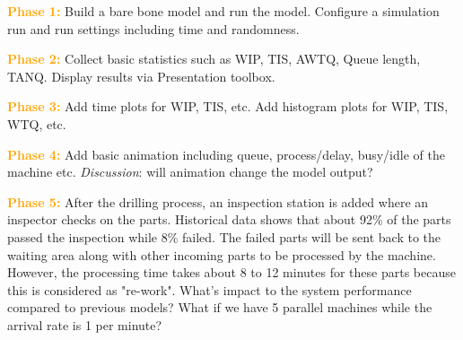 \documentclass{article}
\begin{document}
\vskip 0.3in

\textcolor{orange}{\bf Phase 1:} Build a bare bone model and run the model. Configure a simulation run and run settings including time and randomness. 

\vskip 0.3in

\textcolor{orange}{\bf Phase 2:} Collect basic statistics such as WIP, TIS, AWTQ, Queue length, TANQ. Display results via Presentation toolbox. 
  
\vskip 0.3in

\textcolor{orange}{\bf Phase 3:} Add time plots for WIP, TIS, etc. Add histogram plots for WIP, TIS, WTQ, etc. 

\vskip 0.3in

\textcolor{orange}{\bf Phase 4:} Add basic animation including queue, process/delay, busy/idle of the machine etc. \textit{Discussion}: will animation change the model output?

\vskip 0.3in

\textcolor{orange}{\bf Phase 5:} After the drilling process, an inspection station is added where an inspector checks on the parts. Historical data shows that about 92\% of the parts passed the inspection while
8\% failed. The failed parts will be sent back to the waiting area along with other incoming parts to be processed by the machine. However, the processing time takes about 8 to 12 minutes for these parts because 
this is considered as "re-work". What's impact to the system performance compared to previous models? What if we have 5 parallel machines while the arrival rate is 1 per minute?
\end{document}

